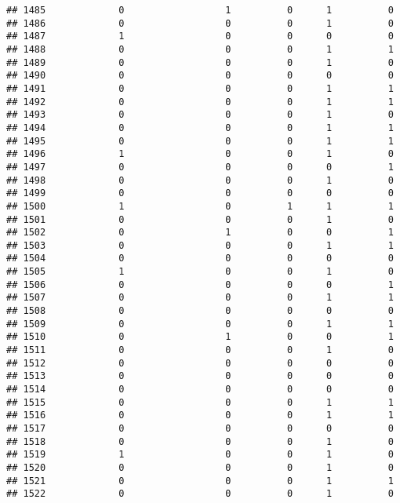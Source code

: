 \documentclass[
]{article}
\begin{document}
\begin{verbatim}
## 1485             0                  1          0      1          0
## 1486             0                  0          0      1          0
## 1487             1                  0          0      0          0
## 1488             0                  0          0      1          1
## 1489             0                  0          0      1          0
## 1490             0                  0          0      0          0
## 1491             0                  0          0      1          1
## 1492             0                  0          0      1          1
## 1493             0                  0          0      1          0
## 1494             0                  0          0      1          1
## 1495             0                  0          0      1          1
## 1496             1                  0          0      1          0
## 1497             0                  0          0      0          1
## 1498             0                  0          0      1          0
## 1499             0                  0          0      0          0
## 1500             1                  0          1      1          1
## 1501             0                  0          0      1          0
## 1502             0                  1          0      0          1
## 1503             0                  0          0      1          1
## 1504             0                  0          0      0          0
## 1505             1                  0          0      1          0
## 1506             0                  0          0      0          1
## 1507             0                  0          0      1          1
## 1508             0                  0          0      0          0
## 1509             0                  0          0      1          1
## 1510             0                  1          0      0          1
## 1511             0                  0          0      1          0
## 1512             0                  0          0      0          0
## 1513             0                  0          0      0          0
## 1514             0                  0          0      0          0
## 1515             0                  0          0      1          1
## 1516             0                  0          0      1          1
## 1517             0                  0          0      0          0
## 1518             0                  0          0      1          0
## 1519             1                  0          0      1          0
## 1520             0                  0          0      1          0
## 1521             0                  0          0      1          1
## 1522             0                  0          0      1          0

\end{verbatim}
\end{document}
